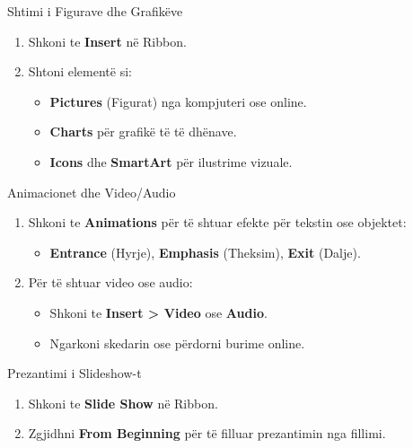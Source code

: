 \documentclass[
  ignorenonframetext,
]{beamer}
\providecommand{\tightlist}{%
  \setlength{\itemsep}{0pt}\setlength{\parskip}{0pt}}
\begin{document}
\begin{frame}{Shtimi i Figurave dhe Grafikëve}
\label{shtimi-i-figurave-dhe-grafikuxebve}
\begin{enumerate}
\item
  Shkoni te \textbf{Insert} në Ribbon.
\item
  Shtoni elementë si:

  \begin{itemize}
  \item
    \textbf{Pictures} (Figurat) nga kompjuteri ose online.
  \item
    \textbf{Charts} për grafikë të të dhënave.
  \item
    \textbf{Icons} dhe \textbf{SmartArt} për ilustrime vizuale.
  \end{itemize}
\end{enumerate}
\end{frame}

\begin{frame}{Animacionet dhe Video/Audio}
\label{animacionet-dhe-videoaudio}
\begin{enumerate}
\item
  Shkoni te \textbf{Animations} për të shtuar efekte për tekstin ose
  objektet:

  \begin{itemize}
  \tightlist
  \item
    \textbf{Entrance} (Hyrje), \textbf{Emphasis} (Theksim),
    \textbf{Exit} (Dalje).
  \end{itemize}
\item
  Për të shtuar video ose audio:

  \begin{itemize}
  \item
    Shkoni te \textbf{Insert \textgreater{} Video} ose \textbf{Audio}.
  \item
    Ngarkoni skedarin ose përdorni burime online.
  \end{itemize}
\end{enumerate}
\end{frame}

\begin{frame}{Prezantimi i Slideshow-t}
\label{prezantimi-i-slideshow-t}
\begin{enumerate}
\item
  Shkoni te \textbf{Slide Show} në Ribbon.
\item
  Zgjidhni \textbf{From Beginning} për të filluar prezantimin nga
  fillimi.
\end{enumerate}
\end{frame}
\end{document}
